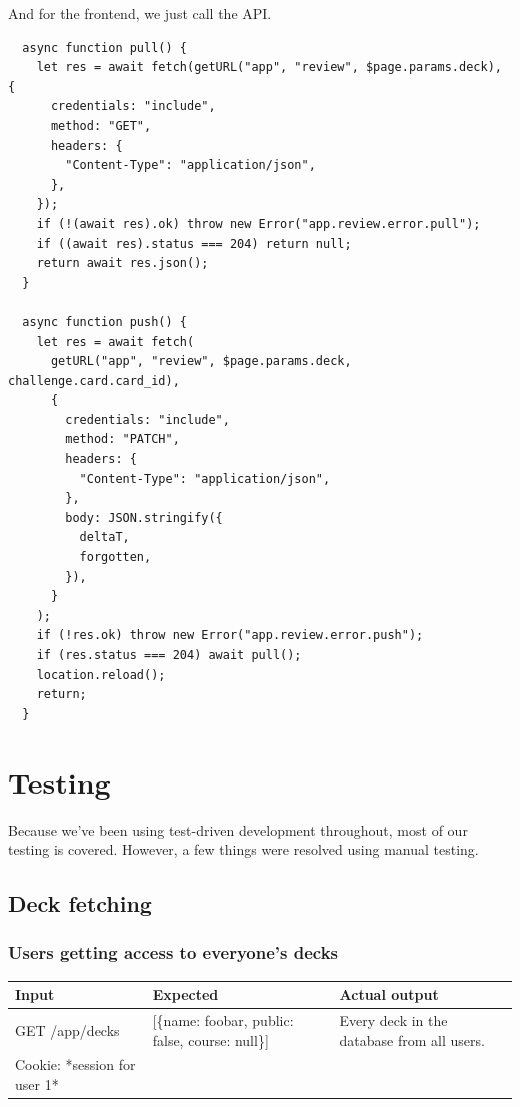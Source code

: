 \documentclass{report}
\begin{document}
And for the frontend, we just call the API.
\begin{verbatim}
  async function pull() {
    let res = await fetch(getURL("app", "review", $page.params.deck), {
      credentials: "include",
      method: "GET",
      headers: {
        "Content-Type": "application/json",
      },
    });
    if (!(await res).ok) throw new Error("app.review.error.pull");
    if ((await res).status === 204) return null;
    return await res.json();
  }

  async function push() {
    let res = await fetch(
      getURL("app", "review", $page.params.deck, challenge.card.card_id),
      {
        credentials: "include",
        method: "PATCH",
        headers: {
          "Content-Type": "application/json",
        },
        body: JSON.stringify({
          deltaT,
          forgotten,
        }),
      }
    );
    if (!res.ok) throw new Error("app.review.error.push");
    if (res.status === 204) await pull();
    location.reload();
    return;
  }
\end{verbatim}

\chapter{Testing}
Because we've been using test-driven development throughout, most of our testing is covered. However, a few things were resolved using manual testing.

\section{Deck fetching}
\subsection{Users getting access to everyone's decks}

\begin{tabular}{|l|p{4cm}|p{4cm}|}
  \cline{1-3}
  Input & Expected & Actual output \\
  \hline \hline
  GET /app/decks & [\{name: foobar, public: false, course: null\}] & Every deck in the database from all users. \\
  Cookie: *session for user 1* && \\
  \hline
\end{tabular}
\end{document}

